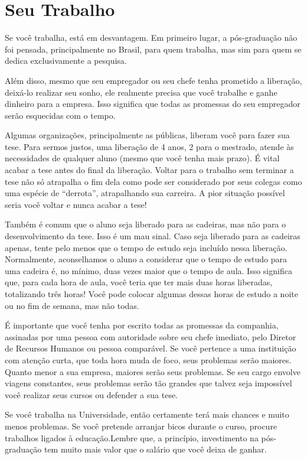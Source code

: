 \section{Seu Trabalho}

Se você trabalha, está em desvantagem. 
Em primeiro lugar, a pós-graduação não foi pensada, principalmente no Brasil, para quem trabalha, mas sim para quem se dedica exclusivamente a pesquisa. 

Além disso, mesmo que seu empregador ou seu chefe tenha prometido a liberação, deixá-lo realizar seu sonho, ele realmente precisa que você trabalhe e ganhe dinheiro para a empresa. Isso significa que todas as promessas do seu empregador serão esquecidas com o tempo.

Algumas organizações, principalmente as públicas, liberam você para fazer sua tese. Para sermos justos, uma liberação de 4 anos, 2 para o mestrado, atende às necessidades de qualquer aluno (mesmo que você tenha mais prazo). É vital acabar a tese antes do final da liberação. Voltar para o trabalho sem terminar a tese não só atrapalha o fim dela como pode ser considerado por seus colegas como uma espécie de ``derrota'', atrapalhando sua carreira. A pior situação possível seria você voltar e nunca acabar a tese! 

Também é comum que o aluno seja liberado para as cadeiras, mas não para o desenvolvimento da tese. Isso é um mau sinal. Caso seja liberado para as cadeiras apenas, tente pelo menos que o tempo de estudo seja incluído nessa liberação. Normalmente, aconselhamos o aluno a considerar que o tempo de estudo para uma cadeira é, no mínimo, duas vezes maior que o tempo de aula. Isso significa que, para cada hora de aula, você teria que ter mais duas horas liberadas, totalizando três horas! Você pode colocar algumas dessas horas de estudo a noite ou no fim de semana, mas não todas.

É importante que você tenha por escrito todas as promessas da companhia, assinadas por uma pessoa com autoridade sobre seu chefe imediato, pelo Diretor de Recursos Humanos ou pessoa comparável.
Se você pertence a uma instituição com atenção curta, que toda hora muda de foco, seus problemas serão maiores. Quanto menor a sua empresa, maiores serão seus problemas. Se seu cargo envolve viagens constantes, seus problemas serão tão grandes que talvez seja impossível você realizar seus cursos ou defender a sua tese.

Se você trabalha na Universidade, então certamente terá mais chances e muito menos problemas. Se você pretende arranjar bicos durante o curso, procure trabalhos ligados à educação.Lembre que, a princípio, investimento na pós-graduação tem muito mais valor que o salário que você deixa de ganhar. 

